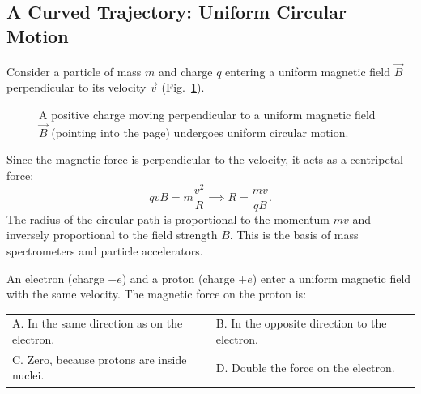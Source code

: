 \subsection{A Curved Trajectory: Uniform Circular Motion}

Consider a particle of mass $m$ and charge $q$ entering a uniform magnetic field $\vec{B}$ perpendicular to its velocity $\vec{v}$ (Fig.~\ref{fig:mag_circle}).

\begin{figure}[H]
\centering
{}
\caption{A positive charge moving perpendicular to a uniform magnetic field $\vec{B}$ (pointing into the page) undergoes uniform circular motion.}
\label{fig:mag_circle}
\end{figure}

Since the magnetic force is perpendicular to the velocity, it acts as a centripetal force:
\begin{equation}
    q v B = m \frac{v^2}{R} \implies R = \frac{m v}{q B}.
\end{equation}
The radius of the circular path is proportional to the momentum $mv$ and inversely proportional to the field strength $B$. This is the basis of mass spectrometers and particle accelerators.

\begin{checkpoint}[8.1]
An electron (charge $-e$) and a proton (charge $+e$) enter a uniform magnetic field with the same velocity. The magnetic force on the proton is:
\newline
\begin{tabular}{ll}
  A. In the same direction as on the electron. & B. In the opposite direction to the electron. \\
  C. Zero, because protons are inside nuclei. & D. Double the force on the electron.
\end{tabular}
\end{checkpoint}

